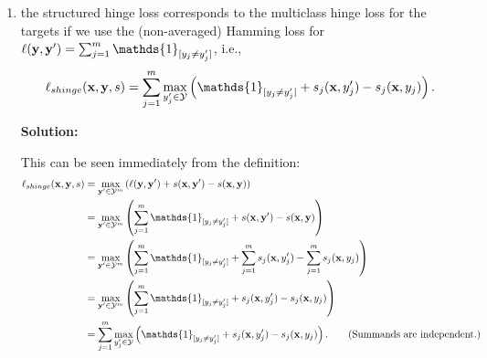 \documentclass[a4paper]{article}
\begin{document}
{\begin{enumerate}
	The idea of conditional random fields is to model the joint conditional distribution $\P(\yv~|~\xv)$ by means of $\pi(\xv,\yv).$
%	
	Thus, it should hold $\P(\yv~|~\xv) \approx \pi(\xv,\yv)$ and with this,
%	
	\begin{align*}
%		
		\P(\yv~|~\xv) 
%		
		&\approx \pi(\xv,\yv) \\
%		
		&= \frac{\exp(s(\xv,\yv))}{\sum_{\yv' \in \Yspace^m} \exp(s(\xv,\yv'))} \\
%		
		&=  \frac{\exp\left(\sum_{j=1}^m s_j(\xv,y_j)\right)}{\sum_{\yv' \in \Yspace^m} \exp \left(  \sum_{j=1}^m s_j(\xv,y_j') \right)} \\
%		
		&=  \frac{ \prod_{j=1}^m \exp\left( s_j(\xv,y_j)\right)}{\sum_{\yv' \in \Yspace^m} \prod_{j=1}^m \exp \left(  s_j(\xv,y_j') \right)} \\
%		
		&=  \frac{ \prod_{j=1}^m \exp\left( s_j(\xv,y_j)\right)}{ \prod_{j=1}^m \sum_{y_j' \in \Yspace}  \exp \left(  s_j(\xv,y_j') \right)} \\
%		
		&= \prod_{j=1}^m \underbrace{\frac{  \exp\left( s_j(\xv,y_j)\right)}{ \sum_{y_j' \in \Yspace}  \exp \left(  s_j(\xv,y_j') \right)}}_{ =:\pi_j(\xv,y_j) }. \\
%		
	\end{align*}
%
	So, if $\pi_j(\xv,y_j)$ is interpreted as a model for the marginal conditional distribution $\P(y_j~|~\xv),$ we see from above
%	
	$$   \P(\yv~|~\xv) \approx \prod_{j=1}^m \P(y_j~|~\xv),	$$
%	
	i.e., the targets are conditionally independent.

	

	\item the structured hinge loss corresponds to the multiclass hinge loss for the targets if we use the (non-averaged) Hamming loss for $\ell(\yv,\yv')= \sum_{j=1}^m \mathds{1}_{[y_j \neq y_j']} $, i.e.,
%	
	$$	\ell_{shinge}(\xv,\yv,s) =  \sum_{j=1}^m \max_{y_j' \in \Yspace} \left( \mathds{1}_{[y_j \neq y_j']} + s_j(\xv,y_j')	- s_j(\xv,y_j) \right).	$$
%	

	\textbf{Solution:}
%	
	
	This can be seen immediately from the definition:
%	
	\begin{align*}
%		
		\ell_{shinge}(\xv,\yv,s) 
%		
		&= \max_{\yv' \in \Yspace^m} \left( \ell(\yv,\yv') + s(\xv,\yv')	 - s(\xv,\yv) \right) \\
%		
		&=  \max_{\yv' \in \Yspace^m} \left( \sum_{j=1}^m \mathds{1}_{[y_j \neq y_j']} + s(\xv,\yv')	 - s(\xv,\yv) \right) \\
%		
		&=  \max_{\yv' \in \Yspace^m} \left( \sum_{j=1}^m \mathds{1}_{[y_j \neq y_j']} +  \sum_{j=1}^m s_j(\xv,y_j')	 -  \sum_{j=1}^m s_j(\xv,y_j) \right) \\
%		
		&=  \max_{\yv' \in \Yspace^m} \left( \sum_{j=1}^m \mathds{1}_{[y_j \neq y_j']} +   s_j(\xv,y_j')	 -   s_j(\xv,y_j) \right) \\
%		
		&=  \sum_{j=1}^m \max_{y_j' \in \Yspace} \left( \mathds{1}_{[y_j \neq y_j']} + s_j(\xv,y_j')	- s_j(\xv,y_j) \right). \tag{Summands are independent.}
%		 
%		
	\end{align*}
	
\end{enumerate} 
}
\end{document}
